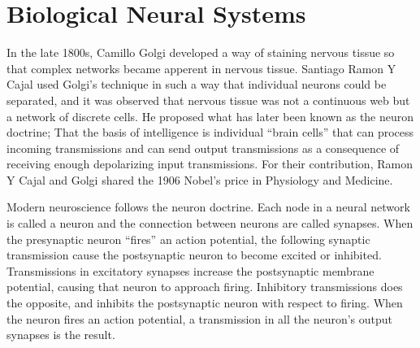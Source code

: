 
% 







\section{Biological Neural Systems}
\label{secBiologicalNeuralSystems}	
	In the late 1800s, Camillo Golgi developed a way of staining nervous tissue so that complex networks became apperent in nervous tissue.
	Santiago Ramon Y Cajal used Golgi's technique in such a way that individual neurons could be separated, and it was observed that nervous tissue was not a continuous web but a network of discrete cells. 
	He proposed what has later been known as the neuron doctrine; That the basis of intelligence is individual ``brain cells'' that can process incoming transmissions and 
		can send output transmissions as a consequence of receiving enough depolarizing input transmissions.
	For their contribution, Ramon Y Cajal and Golgi shared the 1906 Nobel's price in Physiology and Medicine.
	\cite{NeuroscienceExploringTheBrain3edKAP2}

	Modern neuroscience follows the neuron doctrine. 
	Each node in a neural network is called a neuron and the connection between neurons are called synapses.
	When the presynaptic neuron ``fires'' an action potential, the following synaptic transmission cause the postsynaptic neuron to become excited or inhibited.
	Transmissions in excitatory synapses increase the postsynaptic membrane potential, causing that neuron to approach firing. %
	Inhibitory transmissions does the opposite, and inhibits the postsynaptic neuron with respect to firing.
	When the neuron fires an action potential, a transmission in all the neuron's output synapses is the result. %
	\cite{PrinciplesOfNeuralScience4edKAP02}


